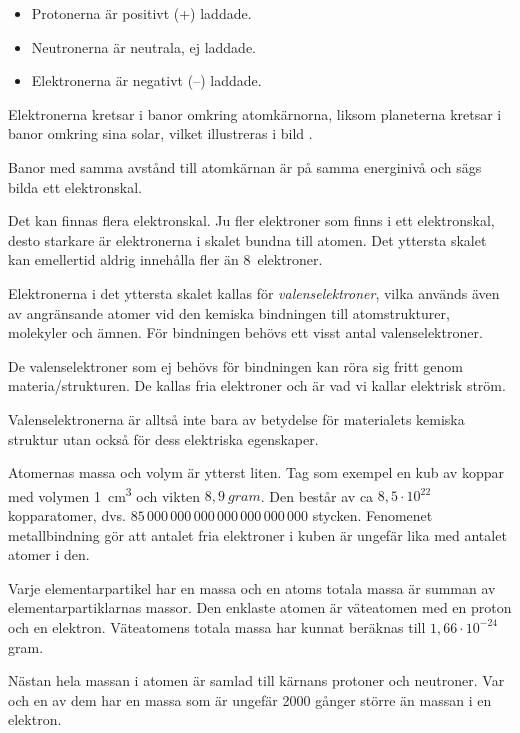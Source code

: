 \begin{itemize}
	\item Protonerna är positivt (+) laddade.
	\item Neutronerna är neutrala, ej laddade.
	\item Elektronerna är negativt (--) laddade.
\end{itemize}


Elektronerna kretsar i banor omkring atomkärnorna, liksom
planeterna kretsar i banor omkring sina solar, vilket illustreras i bild
.

Banor med samma avstånd till atomkärnan är på samma energinivå och sägs bilda
ett elektronskal.

Det kan finnas flera elektronskal.
Ju fler elektroner som finns i ett elektronskal, desto starkare är elektronerna
i skalet bundna till atomen.
Det yttersta skalet kan emellertid aldrig innehålla fler än 8~elektroner.

Elektronerna i det yttersta skalet kallas för \emph{valenselektroner}, vilka
används även av angränsande atomer vid den kemiska bindningen till
atomstrukturer, molekyler och ämnen.
För bindningen behövs ett visst antal valenselektroner.

De valenselektroner som ej behövs för bindningen kan röra sig fritt genom
materia/strukturen.
De kallas fria elektroner och är vad vi kallar elektrisk ström.

Valenselektronerna är alltså inte bara av betydelse för materialets kemiska
struktur utan också för dess elektriska egenskaper.

Atomernas massa och volym är ytterst liten.
Tag som exempel en kub av koppar med volymen \qty{1}{\cubic\centi\metre} och vikten
\(8,9\ gram\).
Den består av ca \(8,5 \cdot 10^{22}\) kopparatomer, dvs.
\(85\, 000\, 000\, 000\, 000\, 000\, 000\, 000\) stycken.
Fenomenet metallbindning gör att antalet fria elektroner i kuben är ungefär lika
med antalet atomer i den.

Varje elementarpartikel har en massa och en atoms totala massa är summan av
elementarpartiklarnas massor.
Den enklaste atomen är väteatomen med en proton och en elektron.
Väteatomens totala massa har kunnat beräknas till \(1,66 \cdot 10^{-24}\) gram.

Nästan hela massan i atomen är samlad till kärnans protoner och neutroner.
Var och en av dem har en massa som är ungefär 2000 gånger större än massan i en
elektron.


